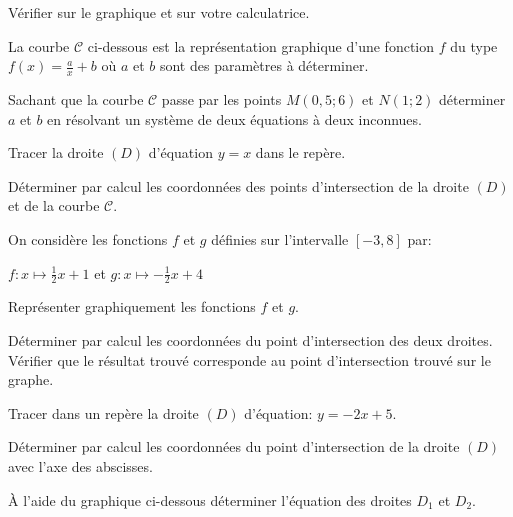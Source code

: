 \documentclass[a4paper,12pt]{scrartcl}
\begin{document}
\question{}
Vérifier sur le graphique et sur votre calculatrice.

\exo{}

La courbe $\mathcal{C}$ ci-dessous est la représentation graphique d'une fonction $f$ du type $f(x) = \frac{a}{x} + b$ où $a$ et $b$ sont des paramètres à déterminer. 

\begin{center}
\end{center}

\question{}
Sachant que la courbe $\mathcal{C}$ passe par les points $M(0,5 ; 6)$ et $N(1 ;2)$ déterminer $a$ et $b$ en résolvant un système de deux équations à deux inconnues.

\question{}
Tracer la droite $(D)$ d'équation $y = x$ dans le repère.

\question{}
Déterminer par calcul les coordonnées des points d'intersection de la droite $(D)$ et de la courbe $\mathcal{C}$.

\exo{}
On considère les fonctions $f$ et $g$ définies sur l'intervalle $[-3,8]$ par: 

$f:x \longmapsto \frac{1}{2}x+1$ et $g:x \longmapsto -\frac{1}{2}x+4$

\question{}
Représenter graphiquement les fonctions $f$ et $g$.

\question{}
Déterminer par calcul les coordonnées du point d'intersection des deux droites. Vérifier que le résultat trouvé corresponde au point d'intersection trouvé sur le graphe.

\exo{}

\question{}
Tracer dans un repère la droite $(D)$ d'équation: $y = -2x + 5$.

\question{}
Déterminer par calcul les coordonnées du point d'intersection de la droite $(D)$ avec l'axe des abscisses.

	\exo{}
	À l'aide du graphique ci-dessous déterminer l'équation des droites $D_1$ et $D_2$.
\end{document}
